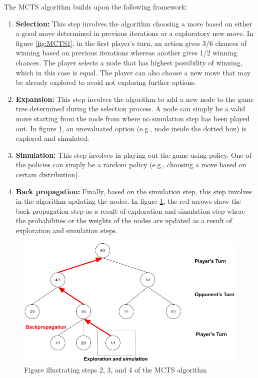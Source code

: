The \gls{MCTS} algorithm builds upon the following framework:
\begin{enumerate}
    \item \textbf{Selection:} This step involves the algorithm choosing a move based on either a good move determined in previous iterations or a exploratory new move. In figure \ref{fig:MCTS1}, in the first player's turn, an action gives 3/6 chances of winning based on previous iterations whereas another gives 1/2 winning chances. The player selects a node that has highest possibility of winning, which in this case is equal. The player can also choose a new move that may be already explored to avoid not exploring further options.
    \item \textbf{Expansion:} This step involves the algorithm to add a new node to the game tree determined during the selection process. A node can simply be a valid move starting from the node from where no simulation step has been played out. In figure \ref{fig:MCTS2}, an unevaluated option (e.g., node inside the dotted box) is explored and simulated.
    \item \textbf{Simulation:} This step involves in playing out the game using policy. One of the policies can simply be a random policy (e.g., choosing a move based on certain distribution).
    \item \textbf{Back propagation:} Finally, based on the simulation step, this step involves in the algorithm updating the nodes. In figure \ref{fig:MCTS2}, the red arrows show the back propagation step as a result of exploration and simulation step where the probabilities or the weights of the nodes are updated as a result of exploration and simulation steps.
\end{enumerate}

\begin{figure}[!ht]
    \centering
    \includegraphics[width=\linewidth]{../img/MCTS2.png}
    \caption{Figure illustrating steps 2, 3, and 4 of the MCTS algorithm}
    \label{fig:MCTS2}
\end{figure}

